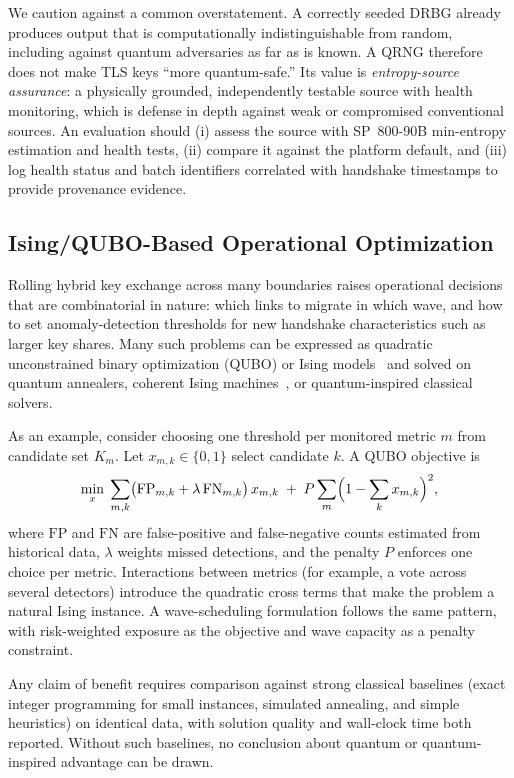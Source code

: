 \documentclass[conference]{IEEEtran}
\begin{document}
We caution against a common overstatement. A correctly seeded DRBG already produces output that is computationally indistinguishable from random, including against quantum adversaries as far as is known. A QRNG therefore does not make TLS keys ``more quantum-safe.'' Its value is \emph{entropy-source assurance}: a physically grounded, independently testable source with health monitoring, which is defense in depth against weak or compromised conventional sources. An evaluation should (i) assess the source with SP~800-90B min-entropy estimation and health tests, (ii) compare it against the platform default, and (iii) log health status and batch identifiers correlated with handshake timestamps to provide provenance evidence.

\subsection{Ising/QUBO-Based Operational Optimization}
Rolling hybrid key exchange across many boundaries raises operational decisions that are combinatorial in nature: which links to migrate in which wave, and how to set anomaly-detection thresholds for new handshake characteristics such as larger key shares. Many such problems can be expressed as quadratic unconstrained binary optimization (QUBO) or Ising models~\cite{lucas2014} and solved on quantum annealers, coherent Ising machines~\cite{inagaki2016}, or quantum-inspired classical solvers.

As an example, consider choosing one threshold per monitored metric $m$ from candidate set $K_m$. Let $x_{m,k}\in\{0,1\}$ select candidate $k$. A QUBO objective is
\begin{equation}
\min_{x}\; \sum_{m,k} \bigl(\mathrm{FP}_{m,k} + \lambda\,\mathrm{FN}_{m,k}\bigr)\, x_{m,k}
\; + \; P \sum_{m} \Bigl(1-\sum_{k} x_{m,k}\Bigr)^{2},
\end{equation}
where $\mathrm{FP}$ and $\mathrm{FN}$ are false-positive and false-negative counts estimated from historical data, $\lambda$ weights missed detections, and the penalty $P$ enforces one choice per metric. Interactions between metrics (for example, a vote across several detectors) introduce the quadratic cross terms that make the problem a natural Ising instance. A wave-scheduling formulation follows the same pattern, with risk-weighted exposure as the objective and wave capacity as a penalty constraint.

Any claim of benefit requires comparison against strong classical baselines (exact integer programming for small instances, simulated annealing, and simple heuristics) on identical data, with solution quality and wall-clock time both reported. Without such baselines, no conclusion about quantum or quantum-inspired advantage can be drawn.
\end{document}
